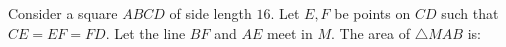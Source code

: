 Consider a square $ABCD$ of side length $16$. Let $E,F$ be points on $CD$ such that $CE = EF = FD$. Let the line $BF$ and $AE$ meet in $M$. The area of $\bigtriangleup MAB$ is:
